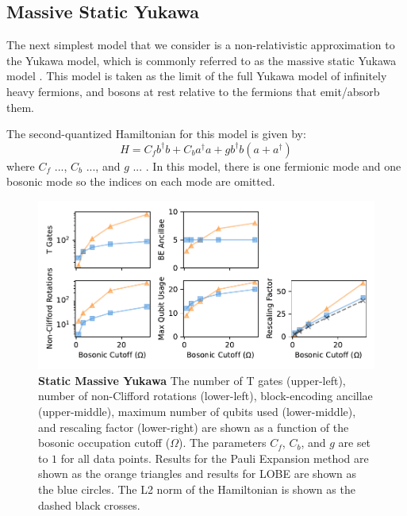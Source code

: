 \subsection{Massive Static Yukawa}
\label{sec:static_yukawa}

The next simplest model that we consider is a non-relativistic approximation to the Yukawa model, which is commonly referred to as the massive static Yukawa model \cite{PhysRevD.103.014021}.
This model is taken as the limit of the full Yukawa model of infinitely heavy fermions, and bosons at rest relative to the fermions that emit/absorb them.

The second-quantized Hamiltonian for this model is given by:
\begin{equation}
    \label{eq:static-yukawa}
    H = C_f b^\dagger b + C_b a^\dagger a + g b^\dagger b \left( a + a^\dagger \right)
\end{equation}
where $C_f$ ..., $C_b$ ..., and $g$ ... .
In this model, there is one fermionic mode and one bosonic mode so the indices on each mode are omitted. 

\begin{figure}
    \label{fig:static_yukawa}
    \includegraphics[width = 16cm]{figures/static_yukawa.pdf}
    \caption{
        \textbf{Static Massive Yukawa}
        The number of T gates (upper-left), number of non-Clifford rotations (lower-left), block-encoding ancillae (upper-middle), maximum number of qubits used (lower-middle), and rescaling factor (lower-right) are shown as a function of the bosonic occupation cutoff ($\Omega$).
        The parameters $C_f$, $C_b$, and $g$ are set to $1$ for all data points.
        Results for the Pauli Expansion method are shown as the orange triangles and results for LOBE are shown as the blue circles.
        The L2 norm of the Hamiltonian is shown as the dashed black crosses.
    }
\end{figure}

